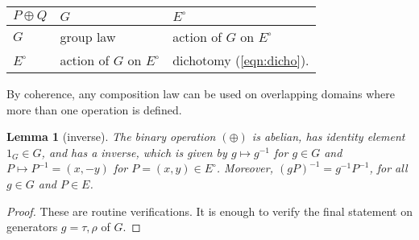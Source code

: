 \documentclass[12pt]{article}
\newtheorem{lemma}[theorem]{Lemma}
\newcommand{\Eoo}{E^{\circ}}
\newcommand{\hplus}{\oplus}
\newcommand{\Go}{\langle\rho\rangle}
\begin{document}
{
\centering
\begin{tabular}{l || l | l}
$P\oplus Q$ & $G$ & $\Eoo$ \\ \hline \hline
$G$ & group law & action of $G$ on $\Eoo$\\
$\Eoo$ & action of $G$ on $\Eoo$ & dichotomy (\ref{eqn:dicho}).
\end{tabular}
}


By coherence, any composition law can be used on
overlapping domains where more than one operation is defined.

\begin{lemma}[inverse]\label{lemma:inv2} 
The binary operation $(\hplus)$ is abelian, has identity
  element $1_G\in G$, and has a inverse, which
   is given by $g\mapsto g^{-1}$ for $g\in G$
  and $P\mapsto P^{-1} = (x,-y)$ for $P=(x,y)\in \Eoo$.  Moreover, 
  $(g P)^{-1} = g^{-1} P^{-1}$, for all $g\in G$ and $P\in E$.
\end{lemma}

\begin{proof} These are routine verifications.  It is enough to 
verify the final statement on generators $g=\tau,\rho$ of $G$.
\end{proof}

\end{document}
